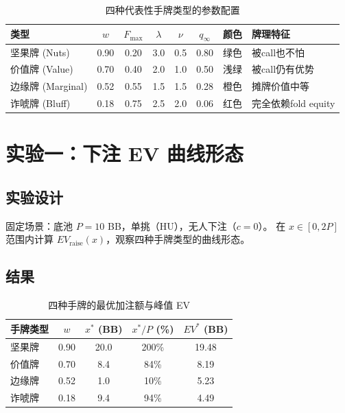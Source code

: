 \documentclass[12pt,a4paper]{ctexart}
\begin{document}
\begin{table}[H]
\centering
\caption{四种代表性手牌类型的参数配置}
\begin{tabular}{@{}lccccccl@{}}
\toprule
\textbf{类型} & $w$ & $F_{\max}$ & $\lambda$ & $\nu$ & $q_{\infty}$ & \textbf{颜色} & \textbf{牌理特征} \\
\midrule
坚果牌 (Nuts)   & 0.90 & 0.20 & 3.0 & 0.5 & 0.80 & 绿色 & 被call也不怕 \\
价值牌 (Value)  & 0.70 & 0.40 & 2.0 & 1.0 & 0.50 & 浅绿 & 被call仍有优势 \\
边缘牌 (Marginal) & 0.52 & 0.55 & 1.5 & 1.5 & 0.28 & 橙色 & 摊牌价值中等 \\
诈唬牌 (Bluff)  & 0.18 & 0.75 & 2.5 & 2.0 & 0.06 & 红色 & 完全依赖fold equity \\
\bottomrule
\end{tabular}
\end{table}

\section{实验一：下注 EV 曲线形态}

\subsection{实验设计}

固定场景：底池 $P = 10$ BB，单挑（HU），无人下注（$c = 0$）。
在 $x \in [0, 2P]$ 范围内计算 $EV_{\text{raise}}(x)$，观察四种手牌类型的曲线形态。

\subsection{结果}

\begin{table}[H]
\centering
\caption{四种手牌的最优加注额与峰值 EV}
\begin{tabular}{@{}lcccc@{}}
\toprule
\textbf{手牌类型} & $w$ & $x^*$ (BB) & $x^*/P$ (\%) & $EV^*$ (BB) \\
\midrule
坚果牌  & 0.90 & 20.0 & 200\% & 19.48 \\
价值牌  & 0.70 & 8.4  & 84\%  & 8.19  \\
边缘牌  & 0.52 & 1.0  & 10\%  & 5.23  \\
诈唬牌  & 0.18 & 9.4  & 94\%  & 4.49  \\
\bottomrule
\end{tabular}
\end{table}
\end{document}
